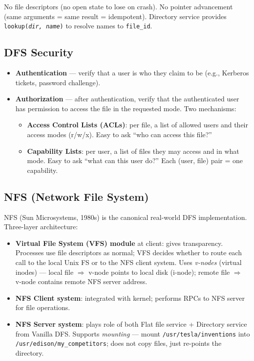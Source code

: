 \documentclass[12pt,a4paper]{article}
\begin{document}
No file descriptors (no open state to lose on crash). No pointer advancement (same arguments = same result = idempotent). Directory service provides \texttt{lookup(\emph{dir, name})} to resolve names to \texttt{file\_id}.

\subsection{DFS Security}

\begin{itemize}[noitemsep]
  \item \textbf{Authentication} --- verify that a user is who they claim to be (e.g., Kerberos tickets, password challenge).
  \item \textbf{Authorization} --- after authentication, verify that the authenticated user has permission to access the file in the requested mode. Two mechanisms:
    \begin{itemize}[noitemsep]
      \item \textbf{Access Control Lists (ACLs)}: per file, a list of allowed users and their access modes (r/w/x). Easy to ask ``who can access this file?''
      \item \textbf{Capability Lists}: per user, a list of files they may access and in what mode. Easy to ask ``what can this user do?'' Each (user, file) pair = one capability.
    \end{itemize}
\end{itemize}

\subsection{NFS (Network File System)}

NFS (Sun Microsystems, 1980s) is the canonical real-world DFS implementation. Three-layer architecture:
\begin{itemize}[noitemsep]
  \item \textbf{Virtual File System (VFS) module} at client: gives transparency. Processes use file descriptors as normal; VFS decides whether to route each call to the local Unix FS or to the NFS client system. Uses \emph{v-nodes} (virtual inodes) --- local file $\Rightarrow$ v-node points to local disk (i-node); remote file $\Rightarrow$ v-node contains remote NFS server address.
  \item \textbf{NFS Client system}: integrated with kernel; performs RPCs to NFS server for file operations.
  \item \textbf{NFS Server system}: plays role of both Flat file service + Directory service from Vanilla DFS. Supports \emph{mounting} --- mount \texttt{/usr/tesla/inventions} into \texttt{/usr/edison/my\_competitors}; does not copy files, just re-points the directory.
\end{itemize}
\end{document}

